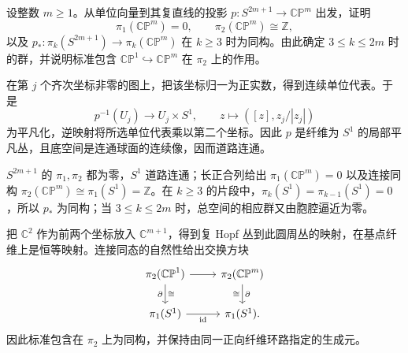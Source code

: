 \begin{exercise}\label{g2:ex:projective-higher-homotopy}
	设整数 \(m\ge1\)。从单位向量到其复直线的投影 \(p:S^{2m+1}\rightarrow\mathbb{CP}^m\) 出发，证明
	\[
		\pi_1(\mathbb{CP}^m)=0,\qquad\pi_2(\mathbb{CP}^m)\cong\mathbb Z,
	\]
	以及 \(p_*:\pi_k(S^{2m+1})\rightarrow\pi_k(\mathbb{CP}^m)\) 在 \(k\ge3\) 时为同构。由此确定 \(3\le k\le2m\) 时的群，并说明标准包含 \(\mathbb{CP}^1\hookrightarrow\mathbb{CP}^m\) 在 \(\pi_2\) 上的作用。
\end{exercise}
\begin{solution}
	在第 \(j\) 个齐次坐标非零的图上，把该坐标归一为正实数，得到连续单位代表。于是
	\[
		p^{-1}(U_j)\longrightarrow U_j\times S^1,\qquad
		z\longmapsto([z],z_j/|z_j|)
	\]
	为平凡化，逆映射将所选单位代表乘以第二个坐标。因此 \(p\) 是纤维为 \(S^1\) 的局部平凡丛，且底空间是连通球面的连续像，因而道路连通。

	\(S^{2m+1}\) 的 \(\pi_1,\pi_2\) 都为零，\(S^1\) 道路连通；长正合列给出 \(\pi_1(\mathbb{CP}^m)=0\) 以及连接同构 \(\pi_2(\mathbb{CP}^m)\cong\pi_1(S^1)=\mathbb Z\)。在 \(k\ge3\) 的片段中，\(\pi_k(S^1)=\pi_{k-1}(S^1)=0\)，所以 \(p_*\) 为同构；当 \(3\le k\le2m\) 时，总空间的相应群又由胞腔逼近为零。

	把 \(\mathbb C^2\) 作为前两个坐标放入 \(\mathbb C^{m+1}\)，得到复 Hopf 丛到此圆周丛的映射，在基点纤维上是恒等映射。连接同态的自然性给出交换方块
	\[
		\begin{tikzcd}
			\pi_2(\mathbb{CP}^1) \arrow[r] \arrow[d,"\partial"',"\cong"] & \pi_2(\mathbb{CP}^m) \arrow[d,"\partial","\cong"']\\
			\pi_1(S^1) \arrow[r,"\operatorname{id}"'] & \pi_1(S^1).
		\end{tikzcd}
	\]
	因此标准包含在 \(\pi_2\) 上为同构，并保持由同一正向纤维环路指定的生成元。
\end{solution}

